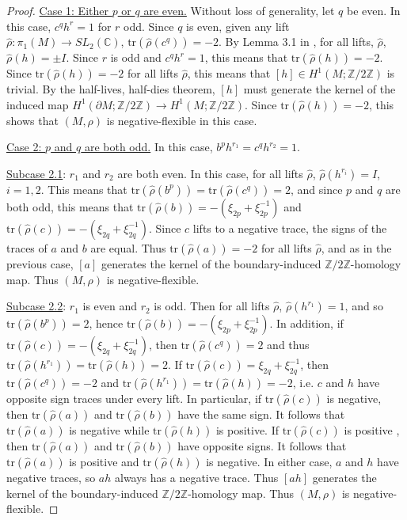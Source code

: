 \documentclass{article}
\theoremstyle{plain}
\theoremstyle{definition}
\theoremstyle{plain}
\theoremstyle{plain}
\theoremstyle{plain}
\theoremstyle{remark}
\theoremstyle{remark}
\theoremstyle{plain}
\theoremstyle{plain}
\begin{document}
\begin{proof}
\medskip

\underline{Case 1: Either $p$ or $q$ are even.} Without loss of generality, let $q$ be even. In this case, $c^qh^r = 1$ for $r$ odd. Since $q$ is even, given any lift $\hat{\rho}: \pi_1(M) \to SL_2(\mathbb{C})$, $\text{tr}(\hat{\rho}(c^q)) = -2$. By Lemma 3.1 in \cite{Kitano1994ReidemeisterTO}, for all lifts, $\hat{\rho}$, $\hat{\rho}(h) = \pm I$. Since $r$ is odd and $c^qh^r = 1$, this means that $\text{tr}(\hat{\rho}(h)) = -2$. Since $\text{tr}(\hat{\rho}(h)) = -2$ for all lifts $\hat{\rho}$, this means that $[h] \in H^1(M; \mathbb{Z}/2\mathbb{Z})$ is trivial. By the half-lives, half-dies theorem, $[h]$ must generate the kernel of the induced map $H^1(\partial M; \mathbb{Z}/2\mathbb{Z}) \to H^1(M; \mathbb{Z}/2\mathbb{Z})$. Since $\text{tr}(\hat{\rho}(h)) = -2$, this shows that $(M, \rho)$ is negative-flexible in this case.

\medskip

\underline{Case 2: $p$ and $q$ are both odd.} In this case, $b^ph^{r_1} = c^qh^{r_2} = 1$. 

\smallskip

\underline{Subcase 2.1}: $r_1$ and $r_2$ are both even. In this case, for all lifts $\hat{\rho}$, $\hat{\rho}(h^{r_i}) = I$, $i = 1, 2$. This means that $\text{tr}(\hat{\rho}(b^p)) = \text{tr}(\hat{\rho}(c^q)) = 2$, and since $p$ and $q$ are both odd, this means that $\text{tr}(\hat{\rho}(b)) = -(\xi_{2p} + \xi_{2p}^{-1})$ and $\text{tr}(\hat{\rho}(c)) = -(\xi_{2q} + \xi_{2q}^{-1})$. Since $c$ lifts to a negative trace, the signs of the traces of $a$ and $b$ are equal. Thus $\text{tr}(\hat{\rho}(a)) = -2$ for all lifts $\hat{\rho}$, and as in the previous case, $[a]$ generates the kernel of the boundary-induced $\mathbb{Z}/2\mathbb{Z}$-homology map. Thus $(M, \rho)$ is negative-flexible. 

\smallskip

\underline{Subcase 2.2}: $r_1$ is even and $r_2$ is odd. Then for all lifts $\hat{\rho}$, $\hat{\rho}(h^{r_1}) = 1$, and so $\text{tr}(\hat{\rho}(b^p)) = 2$, hence $\text{tr}(\hat{\rho}(b)) = -(\xi_{2p} + \xi_{2p}^{-1})$. In addition, if $\text{tr}(\hat{\rho}(c)) = -(\xi_{2q} + \xi_{2q}^{-1})$, then $\text{tr}(\hat{\rho}(c^q)) = 2$ and thus $\text{tr}(\hat{\rho}(h^{r_1})) = \text{tr}(\hat{\rho}(h)) = 2$. If $\text{tr}(\hat{\rho}(c)) = \xi_{2q} + \xi_{2q}^{-1}$, then $\text{tr}(\hat{\rho}(c^q)) = -2$ and $\text{tr}(\hat{\rho}(h^{r_1})) = \text{tr}(\hat{\rho}(h)) = -2$, i.e. $c$ and $h$ have opposite sign traces under every lift. In particular, if $\text{tr}(\hat{\rho}(c))$ is negative, then $\text{tr}(\hat{\rho}(a))$ and $\text{tr}(\hat{\rho}(b))$ have the same sign. It follows that $\text{tr}(\hat{\rho}(a))$ is negative while $\text{tr}(\hat{\rho}(h))$ is positive. If $\text{tr}(\hat{\rho}(c))$ is positive , then $\text{tr}(\hat{\rho}(a))$ and $\text{tr}(\hat{\rho}(b))$ have opposite signs. It follows that $\text{tr}(\hat{\rho}(a))$ is positive and $\text{tr}(\hat{\rho}(h))$ is negative. In either case, $a$ and $h$ have negative traces, so $ah$ always has a negative trace. Thus $[ah]$ generates the kernel of the boundary-induced $\mathbb{Z}/2\mathbb{Z}$-homology map. Thus $(M, \rho)$ is negative-flexible. 


\end{proof}
\end{document}
